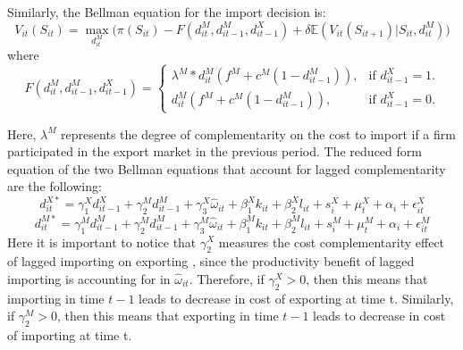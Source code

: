 \documentclass[12pt]{article}
\begin{document}
Similarly, the Bellman equation for the import decision is: 
\begin{equation}
V_{it}(S_{it})= \underset{d_{it}^{M}}{\max}\big(\pi(S_{it}) - F(d_{it}^{M},d_{it-1}^{M}, d_{it-1}^{X})  + \delta \mathbb{E} (V_{it}(S_{it+1})|S_{it}, d_{it}^{M})\Big)
\end{equation}
where 
\begin{equation}
  F(d_{it}^{M},d_{it-1}^{M}, d_{it-1}^{X})=\begin{cases}
   \lambda^{M} * d_{it}^{M}( f^{M} +c^{M}(1-d_{it-1}^{M})), & \text{if $d_{it-1}^{X}= 1$}.\\
   d_{it}^{M}( f^{M} +c^{M}(1-d_{it-1}^{M})) , & \text{if $d_{it-1}^{X}= 0$}.
  \end{cases}
\end{equation}

Here, $\lambda^{M}$ represents the degree of complementarity on the
cost to import if a firm participated in
the export market in the previous period.  The reduced form
equation of the two Bellman equations that account for lagged
complementarity are the following:\\
\begin{equation}
d_{it}^{X*}=   \gamma_{1}^{X} d_{it-1}^{X} + \gamma_{2}^{M} d_{it-1}^{M}+
\gamma_{3}^{X} \hat{\omega}_{it}  + \beta_{1}^{X}k_{it}  +\beta_{2}^{X}l_{it}+
s_{i}^{X} + \mu_{t}^{X}  + \alpha_{i}+ \epsilon_{it}^{X}
\end{equation}
\begin{equation}
d_{it}^{M*}=   \gamma_{1}^{M} d_{it-1}^{M} + \gamma_{2}^{M} d_{it-1}^{M}+
\gamma_{3}^{M} \hat{\omega}_{it}  + \beta_{1}^{M}k_{it}  +\beta_{2}^{M}l_{it}+
s_{i}^{M} + \mu_{t}^{M}  + \alpha_{i}+ \epsilon_{it}^{M}
\end{equation}
Here it is important to notice that  $\gamma_{2}^{X}$ measures the
cost complementarity effect of lagged importing on
exporting , since the productivity benefit of lagged importing is
accounting for in $\hat{\omega}_{it}$.  Therefore, if $\gamma_{2}^{X}>0$, then this means that
importing in time $t-1$ leads to decrease in cost of exporting at time t.  
Similarly, if  $\gamma_{2}^{M}>0$, then this means that
exporting in time $t-1$ leads to decrease in cost of importing at time t.
  
\end{document}
